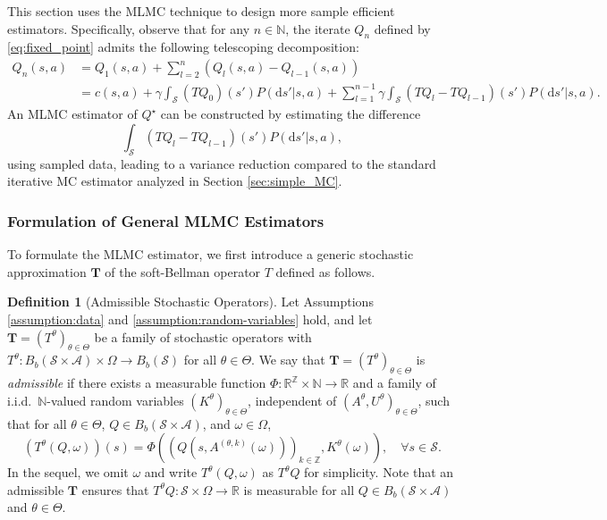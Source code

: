 \documentclass[11pt]{article}
\numberwithin{equation}{section}
\theoremstyle{definition}
\newtheorem{definition}{Definition}[section]
\theoremstyle{remark}
\def\cA{\mathcal{A}}
\def\cS{\mathcal{S}}
\def\d{{\mathrm{d}}}
\def\N{{\mathbb{N}}}
\def\R{{\mathbb R}}
\def\Z{{\mathbb{Z}}}
\begin{document}
This section uses the MLMC technique  
to    
design more sample efficient estimators. Specifically, observe that for any $n\in \N$,
  the iterate  $Q_n$ defined by \eqref{eq:fixed_point} admits     the following telescoping decomposition:  
$$
\begin{aligned}
Q _n(s,a) &= Q_1(s,a) + \sum_{l = 2}^{n} (Q_{l}(s,a) - Q_{l-1}(s,a)) \\
    &= c(s,a)+\gamma \int_\cS (T Q_0)(s') P(\d s'|s,a)+ \sum_{l = 1}^{n - 1} \gamma \int_\cS 
      (T Q_{l} -T Q_{l-1})(s') P(\d s'|s,a).
    \end{aligned}
$$ 
An MLMC estimator 
of $Q^\star$
can be constructed by estimating the difference 
$$\int_\cS 
(T Q_{l} -T Q_{l-1})(s') P(\d s'|s,a),
$$ 
using sampled data, leading to a variance reduction compared to the standard iterative MC estimator analyzed in Section \ref{sec:simple_MC}.  


\subsubsection{Formulation of General MLMC Estimators}

To formulate the MLMC estimator,
we first introduce a generic stochastic approximation \( \mathbf{T} \) of the soft-Bellman operator $T$ defined as follows.

\begin{definition}[Admissible Stochastic Operators]
    \label{def:admissible-stochastic-operator}
    Let   Assumptions \ref{assumption:data} and \ref{assumption:random-variables} hold,
    and let 
    $\mathbf{T} = (T^\theta)_{\theta \in \Theta}$
    be a family of stochastic operators with 
      $T^\theta: B_b(\cS\times \cA) \times \Omega
    \to B_b(\cS) $ for all $\theta\in \Theta$.
    We say that  $\mathbf{T} = (T^\theta)_{\theta \in \Theta} $  is 
     \textit{admissible} if there exists a measurable function $\Phi: \R^{\Z} \times \N \rightarrow \R$ and a family of i.i.d.~$\N$-valued random variables $(K^\theta)_{\theta \in \Theta}$, independent of $(A^\theta, U^\theta)_{\theta \in \Theta}$, such that for all  $\theta\in \Theta$,  $Q  \in  B_b(\mathcal S \times \mathcal A)$,
     and $\omega\in \Omega$,
    \begin{equation*}
        \label{eq:admissible-stochastic-operator}
        \left(T^\theta (Q,\omega)\right) (s) = \Phi \left(\left(Q(s,A^{(\theta,k)}(\omega))\right)_{k \in \Z}, K^\theta(\omega)\right),
        \quad \forall s\in \cS.
    \end{equation*}
    In the sequel, we omit $\omega$ and write $T^\theta (Q,\omega)$
    as $T^\theta Q$ for simplicity. 
   Note that  an admissible $\mathbf{T} $ ensures  that 
   $T^\theta Q: \mathcal S \times \Omega \rightarrow \R$ is measurable for all $Q \in B_b(\mathcal S \times \mathcal A)$ and $\theta\in \Theta$.
\end{definition}
\end{document}
